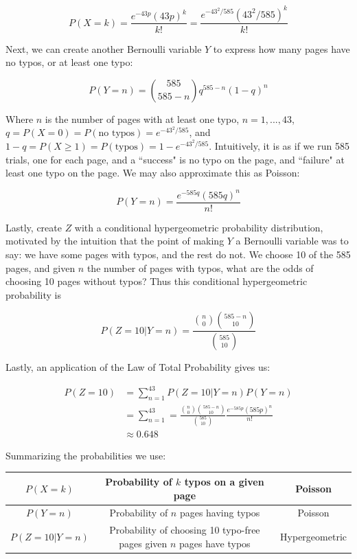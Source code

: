 \documentclass[10pt, oneside]{article}
\begin{document}
\begin{enumerate}[label=8.\arabic*]
\[ P(X = k) = \frac{e^{-43p} (43p)^k}{k!} = \frac{e^{-43^2/585} (43^2/585)^k}{k!} \]

Next, we can create another Bernoulli variable $Y$ to express how many pages have no typos, or at least one typo:

\[ P(Y = n) = \binom{585}{585-n} q^{585-n} (1-q)^n \]

Where $n$ is the number of pages with at least one typo, $n = 1, ..., 43$, $q = P(X = 0) = P(\text{no typos}) = e^{-43^2/585}$, and $1 - q = P(X \geq 1) = P(\text{typos}) = 1 - e^{-43^2/585}$. Intuitively, it is as if we run 585 trials, one for each page, and a ``success" is no typo on the page, and ``failure" at least one typo on the page. We may also approximate this as Poisson:

\[ P(Y = n) = \frac{e^{-585q} (585q)^n}{n!} \]

Lastly, create $Z$ with a conditional hypergeometric probability distribution, motivated by the intuition that the point of making $Y$ a Bernoulli variable was to say: we have some pages with typos, and the rest do not. We choose 10 of the 585 pages, and given $n$ the number of pages with typos, what are the odds of choosing 10 pages without typos? Thus this conditional hypergeometric probability is

\[ P(Z = 10 | Y = n) = \frac{ \binom{n}{0} \binom{585-n}{10} }{ \binom{585}{10} } \]

Lastly, an application of the Law of Total Probability gives us:

\begin{align*}
P(Z = 10) &= \sum^{43}_{n=1} P(Z = 10 | Y = n) P(Y = n) \\
&= \sum^{43}_{n=1} = \frac{ \binom{n}{0} \binom{585-n}{10} }{ \binom{585}{10} } \frac{e^{-585p} (585p)^n}{n!} \\
&\approx \boxed{0.648}
\end{align*}

Summarizing the probabilities we use:

\bgroup
\def\arraystretch{2.5}
\begin{tabular}{ |c|c|c| } 
 \hline
 $P(X = k)$ & Probability of $k$ typos on a given page & Poisson  \\ 
 \hline
 $P(Y = n)$ & Probability of $n$ pages having typos & Poisson  \\ 
 \hline
 $P(Z = 10 | Y = n)$ & Probability of choosing 10 typo-free pages given $n$ pages have typos & Hypergeometric  \\ 
 \hline
\end{tabular}
\egroup


\end{enumerate}
\end{document}
